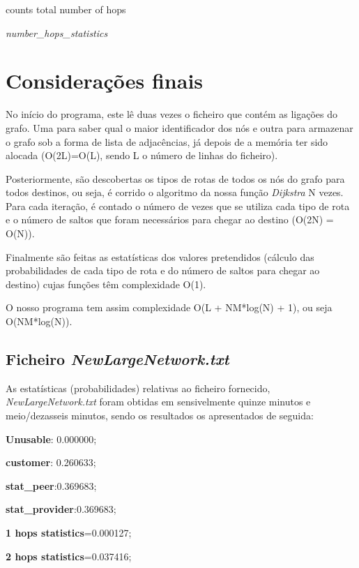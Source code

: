 \documentclass[a4paper]{article}
\begin{document}
\begin{algorithm}[H]
 counts total number of hops\;
 
 
 \caption{\textit{number\_hops\_statistics}}
\end{algorithm}

\section{Considerações finais}
No início do programa, este lê duas vezes o ficheiro que contém as ligações do grafo. Uma para saber qual o maior identificador dos nós e outra para armazenar o grafo sob a forma de lista de adjacências, já depois de a memória ter sido alocada (O(2L)=O(L), sendo L o número de linhas do ficheiro).

Posteriormente, são descobertas os tipos de rotas de todos os nós do grafo para todos destinos, ou seja, é corrido o algoritmo da nossa função \textit{Dijkstra} N vezes. Para cada iteração, é contado o número de vezes que se utiliza cada tipo de rota e o número de saltos que foram necessários para chegar ao destino (O(2N) = O(N)).

Finalmente são feitas as estatísticas dos valores pretendidos (cálculo das probabilidades de cada tipo de rota e do número de saltos para chegar ao destino) cujas funções têm complexidade O(1).

O nosso programa tem assim complexidade O(L + NM*log(N) + 1), ou seja O(NM*log(N)).

\subsection{Ficheiro \textit{NewLargeNetwork.txt}}
As estatísticas (probabilidades) relativas ao ficheiro fornecido, \textit{NewLargeNetwork.txt} foram obtidas em sensivelmente quinze minutos e meio/dezasseis minutos, sendo os resultados os apresentados de seguida:

\textbf{Unusable}: 0.000000;

\textbf{customer}: 0.260633;

\textbf{stat\_peer}:0.369683;

\textbf{stat\_provider}:0.369683;

\textbf{1 hops statistics}=0.000127;

\textbf{2 hops statistics}=0.037416;
\end{document}
